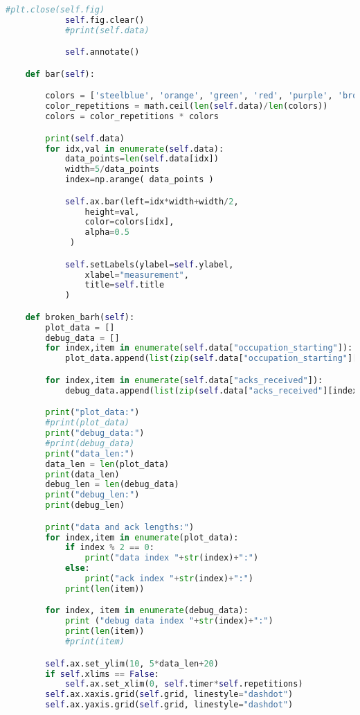 \begin{lstlisting}[language=Python,caption=myplot.py]
            #plt.close(self.fig)
            self.fig.clear()
            #print(self.data)

            self.annotate()

    def bar(self):

        colors = ['steelblue', 'orange', 'green', 'red', 'purple', 'brown', 'pink']
        color_repetitions = math.ceil(len(self.data)/len(colors))
        colors = color_repetitions * colors

        print(self.data)
        for idx,val in enumerate(self.data):
            data_points=len(self.data[idx])
            width=5/data_points
            index=np.arange( data_points )

            self.ax.bar(left=idx*width+width/2,
                height=val,
                color=colors[idx],
                alpha=0.5
             )

            self.setLabels(ylabel=self.ylabel,
                xlabel="measurement",
                title=self.title
            )

    def broken_barh(self):
        plot_data = []
        debug_data = []
        for index,item in enumerate(self.data["occupation_starting"]):
            plot_data.append(list(zip(self.data["occupation_starting"][index], self.data["occupation_durations"][index])))

        for index,item in enumerate(self.data["acks_received"]):
            debug_data.append(list(zip(self.data["acks_received"][index], self.data["acks_received_bar_width"][index])))

        print("plot_data:")
        #print(plot_data)
        print("debug_data:")
        #print(debug_data)
        print("data_len:")
        data_len = len(plot_data)
        print(data_len)
        debug_len = len(debug_data)
        print("debug_len:")
        print(debug_len)

        print("data and ack lengths:")
        for index,item in enumerate(plot_data):
            if index % 2 == 0:
                print("data index "+str(index)+":")
            else:
                print("ack index "+str(index)+":")
            print(len(item))

        for index, item in enumerate(debug_data):
            print ("debug data index "+str(index)+":")
            print(len(item))
            #print(item)

        self.ax.set_ylim(10, 5*data_len+20)
        if self.xlims == False:
            self.ax.set_xlim(0, self.timer*self.repetitions)
        self.ax.xaxis.grid(self.grid, linestyle="dashdot")
        self.ax.yaxis.grid(self.grid, linestyle="dashdot")


\end{lstlisting}

